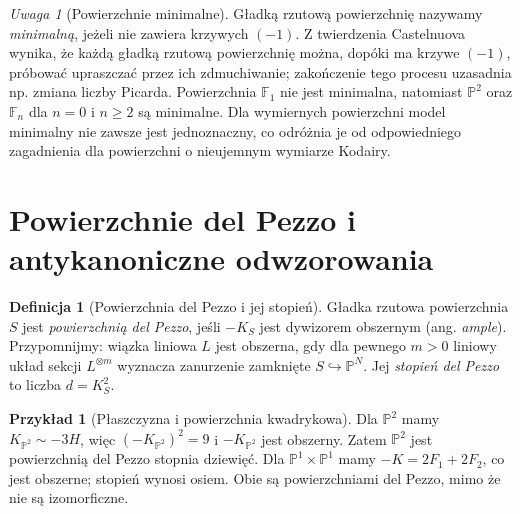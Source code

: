 \documentclass[11pt,a4paper,openany]{report}
\numberwithin{equation}{section}
\theoremstyle{plain}
\theoremstyle{definition}
\newtheorem{definicja}[twierdzenie]{Definicja}
\newtheorem{przyklad}[twierdzenie]{Przykład}
\theoremstyle{remark}
\newtheorem{uwaga}[twierdzenie]{Uwaga}
\newcommand{\PP}{\mathbb P}
\begin{document}
\begin{uwaga}[Powierzchnie minimalne]
Gładką rzutową powierzchnię nazywamy \emph{minimalną},
jeżeli nie zawiera krzywych $(-1)$. Z twierdzenia
Castelnuova wynika, że każdą gładką rzutową powierzchnię
można, dopóki ma krzywe $(-1)$, próbować upraszczać
przez ich zdmuchiwanie; zakończenie tego procesu
uzasadnia np. zmiana liczby Picarda. Powierzchnia
$\mathbb F_1$ nie jest minimalna, natomiast
$\PP^2$ oraz $\mathbb F_n$ dla $n=0$ i $n\ge2$
są minimalne. Dla wymiernych powierzchni model minimalny
nie zawsze jest jednoznaczny, co odróżnia je od
odpowiedniego zagadnienia dla powierzchni o nieujemnym
wymiarze Kodairy.
\end{uwaga}

\section{Powierzchnie del Pezzo i antykanoniczne odwzorowania}
\label{sec:ga6-delpezzo}

\begin{definicja}[Powierzchnia del Pezzo i jej stopień]
Gładka rzutowa powierzchnia $S$ jest \emph{powierzchnią
del Pezzo}, jeśli $-K_S$ jest dywizorem obszernym
(ang. \emph{ample}). Przypomnijmy: wiązka liniowa $L$
jest obszerna, gdy dla pewnego $m>0$ liniowy układ
sekcji $L^{\otimes m}$ wyznacza zanurzenie zamknięte
$S\hookrightarrow\PP^N$. Jej \emph{stopień del Pezzo}
to liczba $d=K_S^2$.
\end{definicja}

\begin{przyklad}[Płaszczyzna i powierzchnia kwadrykowa]
Dla $\PP^2$ mamy $K_{\PP^2}\sim-3H$,
więc $(-K_{\PP^2})^2=9$ i $-K_{\PP^2}$ jest
obszerny. Zatem $\PP^2$ jest powierzchnią del Pezzo
stopnia dziewięć. Dla $\PP^1\times\PP^1$
mamy $-K=2F_1+2F_2$, co jest obszerne;
stopień wynosi osiem. Obie są powierzchniami
del Pezzo, mimo że nie są izomorficzne.
\end{przyklad}
\end{document}
